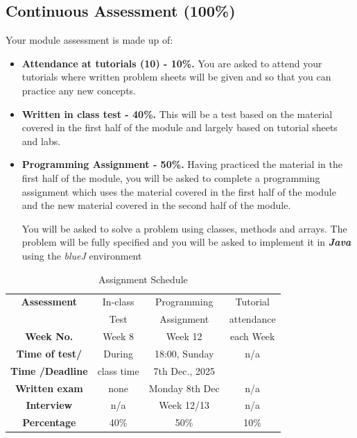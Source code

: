\documentclass{article}
\begin{document}
\subsection{Continuous Assessment (100\%) }
Your module assessment  is made up of:  
    \begin{itemize}
        \item \textbf{Attendance at tutorials (10) - 10\%.} You are  asked to attend your tutorials where written problem sheets will be given and so that you can practice any new concepts. 
        \item \textbf{Written in class test - 40\%.} This will be a test based on the material covered in the first half of the module and largely based on tutorial sheets and labs. 
        \item \textbf{Programming Assignment  - 50\%. }
        Having practiced the material in the first half of the module, you will be asked to complete a programming assignment which uses the material covered in the first half of the module and the new material covered in the second half of the module.
        
        You will be asked to solve a problem using classes, methods and arrays. The problem will be fully specified and you will be asked to implement it in \textbf{\textit{Java}} using the \textit{blueJ} environment
    \end{itemize}

    \begin{table}
        \begin{center}
    \begin{tabular}{|c |  c  | c | c }
    \hline

     \rowcolor{red!60}
     \textbf{Assessment} &In-class & Programming & Tutorial\\  
        \rowcolor{red!60}
      \textbf & Test &  Assignment &  attendance\\  
     \rowcolor{red!30}
     \textbf{Week No.} & Week 8 & Week  12 & each Week   \\ 
      \hline
    
     \rowcolor{red!30}
     \hline
     \textbf{Time of test/} & During &  18:00, Sunday & n/a \\ 
      \rowcolor{red!30}
  \textbf{Time /Deadline} & class time & 7th Dec., 2025 &  \\
    \hline 

      \rowcolor{red!35}
     \textbf{Written exam} &none& Monday 8th Dec& n/a \\ 
     \hline
     \rowcolor{red!40}
     \textbf{Interview} &n/a& Week 12/13 & n/a\\ 
     \hline
     \rowcolor{red!40}
   
     \rowcolor{red!60}
     \textbf{Percentage} &  40\% & 50\%  & 10\% \\ 
     \hline
 
  
    \end{tabular}
    \caption{Assignment Schedule}
    \label{tab:ass-schedule}   
\end{center}
\end{table}
\end{document}
